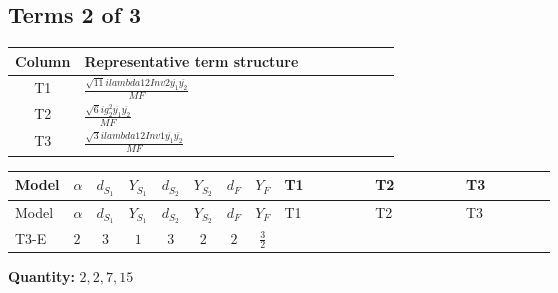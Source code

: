 \documentclass[8pt]{article}
\begin{document}
\begin{landscape}
\subsection*{Terms 2 of 3}
\begin{center}
\begin{tabular}{@{}c >{\raggedright\arraybackslash}p{0.82\linewidth}@{}}
\toprule
Column & Representative term structure \\
\midrule
T1 & \(\displaystyle \frac{\sqrt{11} i lambda12Inv2 \overline{y_{1}} \overline{y_{2}}}{MF}\) \\
\midrule
T2 & \(\displaystyle \frac{\sqrt{6} i g_{2}^{2} \overline{y_{1}} \overline{y_{2}}}{MF}\) \\
\midrule
T3 & \(\displaystyle \frac{\sqrt{3} i lambda12Inv1 \overline{y_{1}} \overline{y_{2}}}{MF}\) \\
\midrule
\bottomrule
\end{tabular}
\end{center}
\smallskip
\tiny
\begin{longtable}{@{}llcccccc >{\raggedright\arraybackslash}p{0.21\linewidth} >{\raggedright\arraybackslash}p{0.21\linewidth} >{\raggedright\arraybackslash}p{0.21\linewidth}@{}}
\toprule
Model & $\alpha$ & $d_{S_1}$ & $Y_{S_1}$ & $d_{S_2}$ & $Y_{S_2}$ & $d_F$ & $Y_F$ & T1 & T2 & T3 \\
\midrule
\endfirsthead
\toprule
Model & $\alpha$ & $d_{S_1}$ & $Y_{S_1}$ & $d_{S_2}$ & $Y_{S_2}$ & $d_F$ & $Y_F$ & T1 & T2 & T3 \\
\midrule
\endhead
T3-E & $2$ & $3$ & $1$ & $3$ & $2$ & $2$ & $\frac{3}{2}$ & \scriptsize\adjustbox{max width=\linewidth}{$\begin{gathered} - \frac{3 \sqrt{11} i lambda12Inv2 \overline{y_{1}} \overline{y_{2}}}{22 MF}\end{gathered}$} & \scriptsize\adjustbox{max width=\linewidth}{$\begin{gathered} - \frac{\sqrt{6} i g_{2}^{2} \overline{y_{1}} \overline{y_{2}}}{3 MF}\end{gathered}$} & \scriptsize\adjustbox{max width=\linewidth}{$\begin{gathered} \frac{\sqrt{3} i lambda12Inv1 \overline{y_{1}} \overline{y_{2}}}{6 MF}\end{gathered}$} \\
\midrule
\bottomrule
\end{longtable}
\clearpage
\noindent\textbf{Quantity: }$\mathrm{2,2,7,15}$\par\smallskip

\end{landscape}
\end{document}
